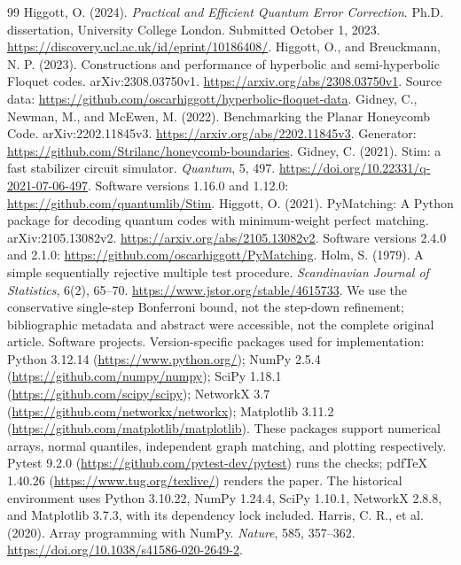 \begin{thebibliography}{99}
 Higgott, O. (2024). \emph{Practical and Efficient Quantum Error Correction}. Ph.D. dissertation, University College London. Submitted October 1, 2023. \url{https://discovery.ucl.ac.uk/id/eprint/10186408/}.
 Higgott, O., and Breuckmann, N. P. (2023). Constructions and performance of hyperbolic and semi-hyperbolic Floquet codes. arXiv:2308.03750v1. \url{https://arxiv.org/abs/2308.03750v1}. Source data: \url{https://github.com/oscarhiggott/hyperbolic-floquet-data}.
 Gidney, C., Newman, M., and McEwen, M. (2022). Benchmarking the Planar Honeycomb Code. arXiv:2202.11845v3. \url{https://arxiv.org/abs/2202.11845v3}. Generator: \url{https://github.com/Strilanc/honeycomb-boundaries}.
 Gidney, C. (2021). Stim: a fast stabilizer circuit simulator. \emph{Quantum}, 5, 497. \url{https://doi.org/10.22331/q-2021-07-06-497}. Software versions 1.16.0 and 1.12.0: \url{https://github.com/quantumlib/Stim}.
 Higgott, O. (2021). PyMatching: A Python package for decoding quantum codes with minimum-weight perfect matching. arXiv:2105.13082v2. \url{https://arxiv.org/abs/2105.13082v2}. Software versions 2.4.0 and 2.1.0: \url{https://github.com/oscarhiggott/PyMatching}.
 Holm, S. (1979). A simple sequentially rejective multiple test procedure. \emph{Scandinavian Journal of Statistics}, 6(2), 65--70. \url{https://www.jstor.org/stable/4615733}. We use the conservative single-step Bonferroni bound, not the step-down refinement; bibliographic metadata and abstract were accessible, not the complete original article.
 Software projects. Version-specific packages used for implementation: Python 3.12.14 (\url{https://www.python.org/}); NumPy 2.5.4 (\url{https://github.com/numpy/numpy}); SciPy 1.18.1 (\url{https://github.com/scipy/scipy}); NetworkX 3.7 (\url{https://github.com/networkx/networkx}); Matplotlib 3.11.2 (\url{https://github.com/matplotlib/matplotlib}). These packages support numerical arrays, normal quantiles, independent graph matching, and plotting respectively. Pytest 9.2.0 (\url{https://github.com/pytest-dev/pytest}) runs the checks; pdfTeX 1.40.26 (\url{https://www.tug.org/texlive/}) renders the paper. The historical environment uses Python 3.10.22, NumPy 1.24.4, SciPy 1.10.1, NetworkX 2.8.8, and Matplotlib 3.7.3, with its dependency lock included.
 Harris, C. R., et al. (2020). Array programming with NumPy. \emph{Nature}, 585, 357--362. \url{https://doi.org/10.1038/s41586-020-2649-2}.

\end{thebibliography}
